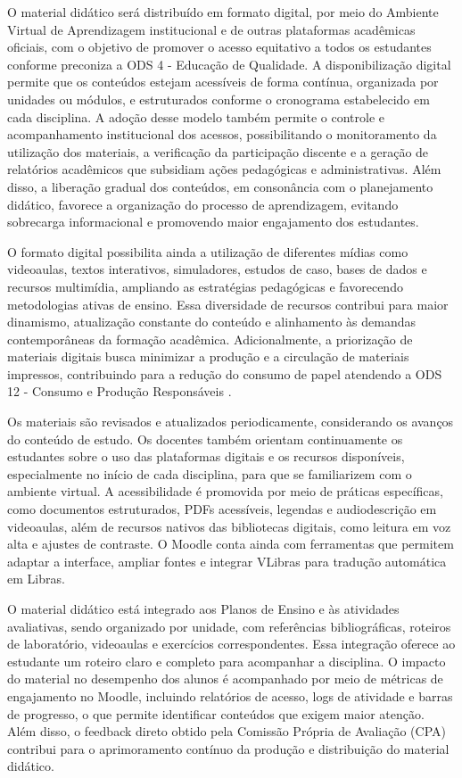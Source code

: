 O material didático será distribuído em formato digital, por meio do Ambiente Virtual de Aprendizagem institucional e de outras plataformas acadêmicas oficiais, com o objetivo de promover o acesso equitativo a todos os estudantes conforme preconiza a ODS 4 - Educação de Qualidade. A disponibilização digital permite que os conteúdos estejam acessíveis de forma contínua, organizada por unidades ou módulos, e estruturados conforme o cronograma estabelecido em cada disciplina. A adoção desse modelo também permite o controle e acompanhamento institucional dos acessos, possibilitando o monitoramento da utilização dos materiais, a verificação da participação discente e a geração de relatórios acadêmicos que subsidiam ações pedagógicas e administrativas. Além disso, a liberação gradual dos conteúdos, em consonância com o planejamento didático, favorece a organização do processo de aprendizagem, evitando sobrecarga informacional e promovendo maior engajamento dos estudantes.

O formato digital possibilita ainda a utilização de diferentes mídias como videoaulas, textos interativos, simuladores, estudos de caso, bases de dados e recursos multimídia, ampliando as estratégias pedagógicas e favorecendo metodologias ativas de ensino. Essa diversidade de recursos contribui para maior dinamismo, atualização constante do conteúdo e alinhamento às demandas contemporâneas da formação acadêmica. Adicionalmente, a priorização de materiais digitais busca minimizar a produção e a circulação de materiais impressos, contribuindo para a redução do consumo de papel atendendo a ODS 12 - Consumo e Produção Responsáveis \cite{UNICEF_ODS_2030}.

Os materiais são revisados e atualizados periodicamente, considerando os avanços do conteúdo de estudo. Os docentes também orientam continuamente os estudantes sobre o uso das plataformas digitais e os recursos disponíveis, especialmente no início de cada disciplina, para que se familiarizem com o ambiente virtual. A acessibilidade é promovida por meio de práticas específicas, como documentos estruturados, PDFs acessíveis, legendas e audiodescrição em videoaulas, além de recursos nativos das bibliotecas digitais, como leitura em voz alta e ajustes de contraste. O Moodle conta ainda com ferramentas que permitem adaptar a interface, ampliar fontes e integrar VLibras para tradução automática em Libras.

O material didático está integrado aos Planos de Ensino e às atividades avaliativas, sendo organizado por unidade, com referências bibliográficas, roteiros de laboratório, videoaulas e exercícios correspondentes. Essa integração oferece ao estudante um roteiro claro e completo para acompanhar a disciplina. O impacto do material no desempenho dos alunos é acompanhado por meio de métricas de engajamento no Moodle, incluindo relatórios de acesso, logs de atividade e barras de progresso, o que permite identificar conteúdos que exigem maior atenção. Além disso, o feedback direto obtido pela Comissão Própria de Avaliação (CPA) contribui para o aprimoramento contínuo da produção e distribuição do material didático.

